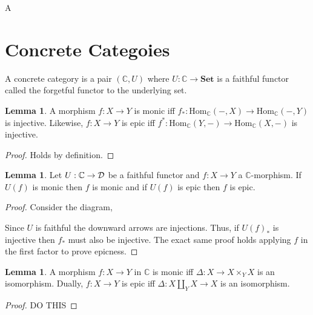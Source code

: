 \documentclass[12pt]{extarticle}
\newcommand{\Hom}[3]{\mathrm{Hom}_{#1}\left( #2, #3 \right)}
\newcommand{\Set}{\mathbf{Set}}
\theoremstyle{definition}
\newtheorem{lemma}[theorem]{Lemma}
\newenvironment{definition}[1][Definition:]{\begin{trivlist}
\item[\hskip \labelsep {\bfseries #1}]}{\end{trivlist}}
\newcommand{\C}{\mathbb{C}}
\begin{document}
\begin{definition}
A 
\end{definition}

\section{Concrete Categoies}


\begin{definition}
A concrete category is a pair $(\C, U)$ where $U : \C \to \Set$ is a faithful functor called the forgetful functor to the underlying set. 
\end{definition}

\begin{lemma}
A morphism $f : X \to Y$ is monic iff $f_* : \Hom{\C}{-}{X} \to \Hom{\C}{-}{Y}$ is injective. Likewise, $f : X \to Y$ is epic iff $f^* : \Hom{\C}{Y}{-} \to \Hom{\C}{X}{-}$ is injective. 
\end{lemma}

\begin{proof}
Holds by definition.
\end{proof}

\begin{lemma}
Let $U : \C \to \D$ be a faithful functor and $f : X \to Y$ a $\C$-morphism. If $U(f)$ is monic then $f$ is monic and if $U(f)$ is epic then $f$ is epic.
\end{lemma}

\begin{proof}
Consider the diagram,
\begin{center}
\end{center}
Since $U$ is faithful the downward arrows are injections. Thus, if $U(f)_*$ is injective then $f_*$ must also be injective. The exact same proof holds applying $f$ in the first factor to prove epicness.
\end{proof}

\begin{lemma}
A morphism $f : X \to Y$ in $\C$ is monic iff $\Delta : X \to X \times_Y X$ is an isomorphism. Dually, $f : X \to Y$ is epic iff $\Delta : X \coprod_Y X \to X$ is an isomorphism. 
\end{lemma}

\begin{proof}
DO THIS
\end{proof}
\end{document}
